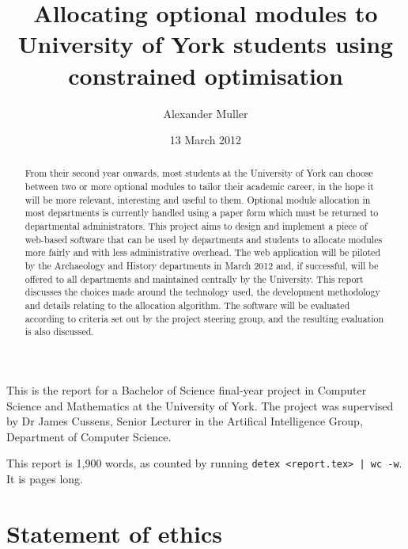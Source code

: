 \documentclass[]{scrartcl}
\title{Allocating optional modules to University of York students using constrained optimisation}
\author{Alexander Muller}
\date{13 March 2012}
\begin{document}
\ifpdf
{}
\else
{}
\fi

\maketitle

This is the report for a Bachelor of Science final-year project in Computer Science and Mathematics at the University of York. The project was supervised by Dr James Cussens, Senior Lecturer in the Artifical Intelligence Group, Department of Computer Science.

This report is 1,900 words, as counted by running \verb+detex <report.tex> | wc -w+. It is \pageref{LastPage} pages long.


\newpage

\begin{abstract}
  From their second year onwards, most students at the University of York can  choose between two or more optional modules to tailor their academic career, in the hope it will be more relevant, interesting and useful to them.
  Optional module allocation in most departments is currently handled using a paper form which must be returned to departmental administrators. This project aims to design and implement a piece of web-based software that can be used by departments and students to allocate modules more fairly and with less administrative overhead.
  The web application will be piloted by the Archaeology and History departments in March 2012 and, if successful, will be offered to all departments and maintained centrally by the University.
  This report discusses the choices made around the technology used, the development methodology and details relating to the allocation algorithm.
  The software will be evaluated according to criteria set out by the project steering group, and the resulting evaluation is also discussed.
\end{abstract}

\newpage

\tableofcontents

\newpage

\section{Statement of ethics}
\end{document}
